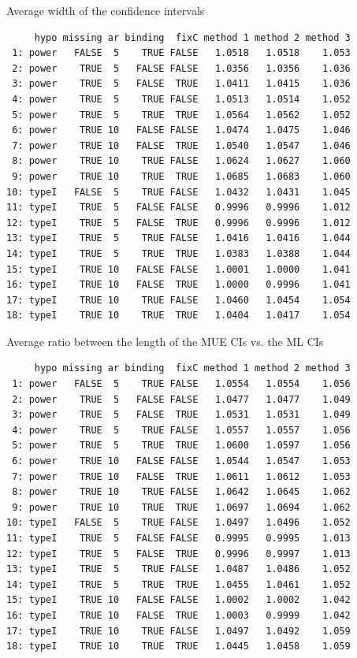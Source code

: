 \documentclass[12pt]{article}
\begin{document}
Average width of the confidence intervals
\begin{verbatim}
     hypo missing ar binding  fixC method 1 method 2 method 3
 1: power   FALSE  5    TRUE FALSE   1.0518   1.0518    1.053
 2: power    TRUE  5   FALSE FALSE   1.0356   1.0356    1.036
 3: power    TRUE  5   FALSE  TRUE   1.0411   1.0415    1.036
 4: power    TRUE  5    TRUE FALSE   1.0513   1.0514    1.052
 5: power    TRUE  5    TRUE  TRUE   1.0564   1.0562    1.052
 6: power    TRUE 10   FALSE FALSE   1.0474   1.0475    1.046
 7: power    TRUE 10   FALSE  TRUE   1.0540   1.0547    1.046
 8: power    TRUE 10    TRUE FALSE   1.0624   1.0627    1.060
 9: power    TRUE 10    TRUE  TRUE   1.0685   1.0683    1.060
10: typeI   FALSE  5    TRUE FALSE   1.0432   1.0431    1.045
11: typeI    TRUE  5   FALSE FALSE   0.9996   0.9996    1.012
12: typeI    TRUE  5   FALSE  TRUE   0.9996   0.9996    1.012
13: typeI    TRUE  5    TRUE FALSE   1.0416   1.0416    1.044
14: typeI    TRUE  5    TRUE  TRUE   1.0383   1.0388    1.044
15: typeI    TRUE 10   FALSE FALSE   1.0001   1.0000    1.041
16: typeI    TRUE 10   FALSE  TRUE   1.0000   0.9996    1.041
17: typeI    TRUE 10    TRUE FALSE   1.0460   1.0454    1.054
18: typeI    TRUE 10    TRUE  TRUE   1.0404   1.0417    1.054
\end{verbatim}

Average ratio between the length of the MUE CIs vs. the ML CIs
\begin{verbatim}
     hypo missing ar binding  fixC method 1 method 2 method 3
 1: power   FALSE  5    TRUE FALSE   1.0554   1.0554    1.056
 2: power    TRUE  5   FALSE FALSE   1.0477   1.0477    1.049
 3: power    TRUE  5   FALSE  TRUE   1.0531   1.0531    1.049
 4: power    TRUE  5    TRUE FALSE   1.0557   1.0557    1.056
 5: power    TRUE  5    TRUE  TRUE   1.0600   1.0597    1.056
 6: power    TRUE 10   FALSE FALSE   1.0544   1.0547    1.053
 7: power    TRUE 10   FALSE  TRUE   1.0611   1.0612    1.053
 8: power    TRUE 10    TRUE FALSE   1.0642   1.0645    1.062
 9: power    TRUE 10    TRUE  TRUE   1.0697   1.0694    1.062
10: typeI   FALSE  5    TRUE FALSE   1.0497   1.0496    1.052
11: typeI    TRUE  5   FALSE FALSE   0.9995   0.9995    1.013
12: typeI    TRUE  5   FALSE  TRUE   0.9996   0.9997    1.013
13: typeI    TRUE  5    TRUE FALSE   1.0487   1.0486    1.052
14: typeI    TRUE  5    TRUE  TRUE   1.0455   1.0461    1.052
15: typeI    TRUE 10   FALSE FALSE   1.0002   1.0002    1.042
16: typeI    TRUE 10   FALSE  TRUE   1.0003   0.9999    1.042
17: typeI    TRUE 10    TRUE FALSE   1.0497   1.0492    1.059
18: typeI    TRUE 10    TRUE  TRUE   1.0445   1.0458    1.059
\end{verbatim}
\end{document}

